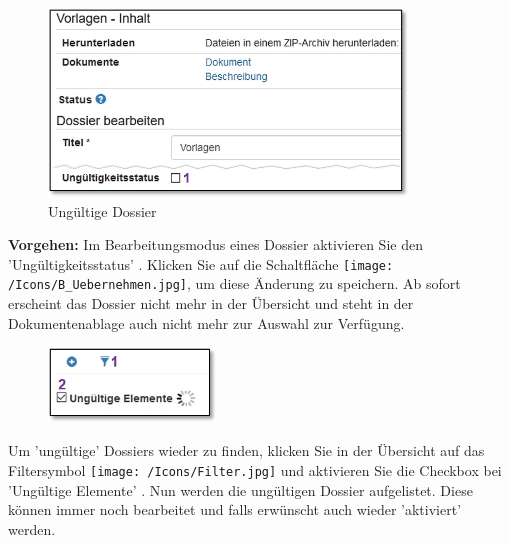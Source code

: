 \vspace{\baselineskip}

\begin{figure}   %
  \vspace{-30pt}      %
  \begin{center}
    \includegraphics[height=50mm]{../chapters/11_Dokumentenablage/pictures/doss_edit_ungueltig.jpg}
  \end{center}
  \vspace{-20pt}
  \caption{Ungültige Dossier}
  \vspace{-10pt}
\end{figure}
\textbf{Vorgehen:} Im Bearbeitungsmodus eines Dossier aktivieren Sie den 'Ungültigkeitsstatus' . Klicken Sie auf die Schaltfläche \texttt{[image: /Icons/B\_Uebernehmen.jpg]}, um diese Änderung zu speichern. Ab sofort erscheint das Dossier nicht mehr in der Übersicht und steht in der Dokumentenablage auch nicht mehr zur Auswahl zur Verfügung.

\vspace{5cm}

\begin{figure}   %
  \vspace{-15pt}      %
  \begin{center}
    \includegraphics[height=20mm]{../chapters/11_Dokumentenablage/pictures/doss_filter_ungueltig.jpg}
  \end{center}
  \vspace{-20pt}
  \vspace{-10pt}
\end{figure}
Um 'ungültige' Dossiers wieder zu finden, klicken Sie in der Übersicht auf das Filtersymbol \texttt{[image: /Icons/Filter.jpg]}  und aktivieren Sie die Checkbox bei 'Ungültige Elemente' . Nun werden die ungültigen Dossier aufgelistet. Diese können immer noch bearbeitet und falls erwünscht auch wieder 'aktiviert' werden.


